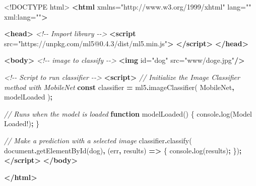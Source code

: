 \documentclass[
]{krantz}
\makeatletter
\newenvironment{Shaded}{\begin{snugshade}}{\end{snugshade}}
\newcommand{\BuiltInTok}[1]{#1}
\newcommand{\CommentTok}[1]{\textcolor[rgb]{0.37,0.37,0.37}{\textit{#1}}}
\newcommand{\DataTypeTok}[1]{\textcolor[rgb]{0.27,0.27,0.27}{#1}}
\newcommand{\FunctionTok}[1]{\textcolor[rgb]{0,0,0}{#1}}
\newcommand{\KeywordTok}[1]{\textcolor[rgb]{0.27,0.27,0.27}{\textbf{#1}}}
\newcommand{\NormalTok}[1]{#1}
\newcommand{\OperatorTok}[1]{\textcolor[rgb]{0.43,0.43,0.43}{\textbf{#1}}}
\newcommand{\OtherTok}[1]{\textcolor[rgb]{0.37,0.37,0.37}{#1}}
\newcommand{\StringTok}[1]{\textcolor[rgb]{0.5,0.5,0.5}{#1}}
\newenvironment{kframe}{%
\medskip{}
\setlength{\fboxsep}{.8em}
 \def\at@end@of@kframe{}%
 \ifinner\ifhmode%
  \def\at@end@of@kframe{\end{minipage}}%
  \begin{minipage}{\columnwidth}%
 \fi\fi%
 \def\FrameCommand##1{\hskip\@totalleftmargin \hskip-\fboxsep
 \colorbox{shadecolor}{##1}\hskip-\fboxsep
     \hskip-\linewidth \hskip-\@totalleftmargin \hskip\columnwidth}%
 \MakeFramed {\advance\hsize-\width
   \@totalleftmargin\z@ \linewidth\hsize
   \@setminipage}}%
 {\par\unskip\endMakeFramed%
 \at@end@of@kframe}
\renewenvironment{Shaded}{\begin{kframe}}{\end{kframe}}
\makeatother
\begin{document}
\begin{Shaded}
\begin{Highlighting}[]
\DataTypeTok{\textless{}!DOCTYPE }\NormalTok{html}\DataTypeTok{\textgreater{}}
\KeywordTok{\textless{}html}\OtherTok{ xmlns=}\StringTok{"http://www.w3.org/1999/xhtml"}\OtherTok{ lang=}\StringTok{""}\OtherTok{ xml:lang=}\StringTok{""}\KeywordTok{\textgreater{}}

\KeywordTok{\textless{}head\textgreater{}}
  \CommentTok{\textless{}!{-}{-} Import library {-}{-}\textgreater{}}
  \KeywordTok{\textless{}script} 
\OtherTok{    src=}\StringTok{"https://unpkg.com/ml5@0.4.3/dist/ml5.min.js"}\KeywordTok{\textgreater{}}
  \KeywordTok{\textless{}/script\textgreater{}}
\KeywordTok{\textless{}/head\textgreater{}}

\KeywordTok{\textless{}body\textgreater{}}
  \CommentTok{\textless{}!{-}{-} image to classify {-}{-}\textgreater{}}
  \KeywordTok{\textless{}img}\OtherTok{ id=}\StringTok{"dog"}\OtherTok{ src=}\StringTok{"www/doge.jpg"}\KeywordTok{/\textgreater{}}

  \CommentTok{\textless{}!{-}{-} Script to run classifier {-}{-}\textgreater{}}
  \KeywordTok{\textless{}script\textgreater{}}
    \CommentTok{// Initialize the Image Classifier method with MobileNet}
    \KeywordTok{const}\NormalTok{ classifier }\OperatorTok{=}\NormalTok{ ml5}\OperatorTok{.}\FunctionTok{imageClassifier}\NormalTok{(}
      \StringTok{\textquotesingle{}MobileNet\textquotesingle{}}\OperatorTok{,}\NormalTok{ modelLoaded}
\NormalTok{    )}\OperatorTok{;}

    \CommentTok{// Runs when the model is loaded}
    \KeywordTok{function} \FunctionTok{modelLoaded}\NormalTok{() \{}
      \BuiltInTok{console}\OperatorTok{.}\FunctionTok{log}\NormalTok{(}\StringTok{\textquotesingle{}Model Loaded!\textquotesingle{}}\NormalTok{)}\OperatorTok{;}
\NormalTok{    \}}

    \CommentTok{// Make a prediction with a selected image}
\NormalTok{    classifier}\OperatorTok{.}\FunctionTok{classify}\NormalTok{(}
      \BuiltInTok{document}\OperatorTok{.}\FunctionTok{getElementById}\NormalTok{(}\StringTok{\textquotesingle{}dog\textquotesingle{}}\NormalTok{)}\OperatorTok{,}\NormalTok{ (err}\OperatorTok{,}\NormalTok{ results) }\KeywordTok{=\textgreater{}}\NormalTok{ \{}
        \BuiltInTok{console}\OperatorTok{.}\FunctionTok{log}\NormalTok{(results)}\OperatorTok{;}
\NormalTok{    \})}\OperatorTok{;}
  \KeywordTok{\textless{}/script\textgreater{}}
\KeywordTok{\textless{}/body\textgreater{}}

\KeywordTok{\textless{}/html\textgreater{}}
\end{Highlighting}
\end{Shaded}
\end{document}
